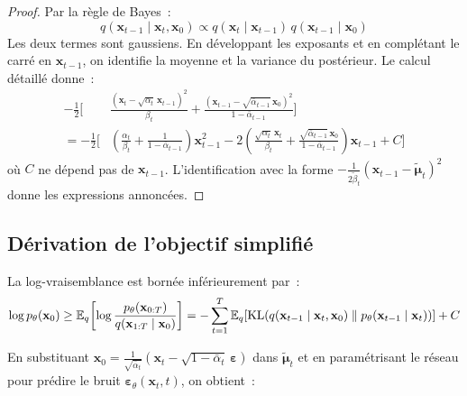 \begin{proof}
Par la r\`egle de Bayes~:
\[
q(\mathbf{x}_{t-1} \mid \mathbf{x}_t, \mathbf{x}_0) \propto q(\mathbf{x}_t \mid \mathbf{x}_{t-1})\,q(\mathbf{x}_{t-1} \mid \mathbf{x}_0)
\]
Les deux termes sont gaussiens. En d\'eveloppant les exposants et en compl\'etant
le carr\'e en $\mathbf{x}_{t-1}$, on identifie la moyenne et la variance du
post\'erieur. Le calcul d\'etaill\'e donne~:
\begin{align}
-\frac{1}{2}\Bigg[&\frac{(\mathbf{x}_t - \sqrt{\alpha_t}\,\mathbf{x}_{t-1})^2}{\beta_t} + \frac{(\mathbf{x}_{t-1} - \sqrt{\bar{\alpha}_{t-1}}\,\mathbf{x}_0)^2}{1 - \bar{\alpha}_{t-1}}\Bigg] \\
= -\frac{1}{2}\Bigg[&\left(\frac{\alpha_t}{\beta_t} + \frac{1}{1 - \bar{\alpha}_{t-1}}\right)\mathbf{x}_{t-1}^2 - 2\left(\frac{\sqrt{\alpha_t}\,\mathbf{x}_t}{\beta_t} + \frac{\sqrt{\bar{\alpha}_{t-1}}\,\mathbf{x}_0}{1 - \bar{\alpha}_{t-1}}\right)\mathbf{x}_{t-1} + C\Bigg]
\end{align}
o\`u $C$ ne d\'epend pas de $\mathbf{x}_{t-1}$. L'identification avec la forme
$-\frac{1}{2\tilde{\beta}_t}(\mathbf{x}_{t-1} - \tilde{\boldsymbol{\mu}}_t)^2$
donne les expressions annonc\'ees.
\end{proof}

\subsection{D\'erivation de l'objectif simplifi\'e}
\label{sec:simplified-loss}

\begin{theoreme}
\label{thm:elbo-diffusion}
La log-vraisemblance est born\'ee inf\'erieurement par~:
\begin{equation}
\log p_\theta(\mathbf{x}_0) \geq \mathbb{E}_q\!\left[\log \frac{p_\theta(\mathbf{x}_{0:T})}{q(\mathbf{x}_{1:T} \mid \mathbf{x}_0)}\right] = -\sum_{t=1}^{T} \mathbb{E}_q\!\left[\mathrm{KL}\!\left(q(\mathbf{x}_{t-1} \mid \mathbf{x}_t, \mathbf{x}_0) \;\|\; p_\theta(\mathbf{x}_{t-1} \mid \mathbf{x}_t)\right)\right] + C
\end{equation}
\end{theoreme}

En substituant $\mathbf{x}_0 = \frac{1}{\sqrt{\bar{\alpha}_t}}(\mathbf{x}_t - \sqrt{1 - \bar{\alpha}_t}\,\boldsymbol{\varepsilon})$
dans $\tilde{\boldsymbol{\mu}}_t$ et en param\'etrisant le r\'eseau pour pr\'edire
le bruit $\boldsymbol{\varepsilon}_\theta(\mathbf{x}_t, t)$, on obtient~:

